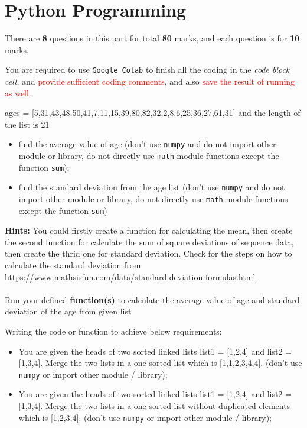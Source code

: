 \documentclass[a4paper]{article}
\begin{document}
    \part{Python Programming}\label{sec:part1}

    There are \textbf{8} questions in this part for total \textbf{80} marks, and each question is for \textbf{10} marks. 
    
    You are required to use \texttt{Google Colab} to 
    finish all the coding in the \textit{code block cell},
    and \textcolor{red}{provide sufficient coding comments},
    and also \textcolor{red}{save the result of running as well}. 
    
    \begin{answer}[Question 1.1] 
        ages = [5,31,43,48,50,41,7,11,15,39,80,82,32,2,8,6,25,36,27,61,31] and the length of the list is 21
        \begin{itemize}
            \item find the average value of age 
            (don't use \texttt{numpy} and do not import other module or library, do not directly use \texttt{math} module functions except the function \texttt{sum});
            \item find the standard deviation from the age list 
            (don't use \texttt{numpy} and do not import other module or library, do not directly use \texttt{math} module functions except the function \texttt{sum})
        \end{itemize} 
        \textbf{Hints:}
        You could firstly create a function for calculating the mean,
        then create the second function for calculate the sum of square deviations of sequence data, then create the thrid one for standard deviation. Check for the steps on how to calculate the standard deviation from \url{https://www.mathsisfun.com/data/standard-deviation-formulas.html}\\
        \\
        Run your defined \textbf{function(s)} to calculate the average value of age and standard deviation of the age from given list
    \end{answer}
    
    \begin{answer}[Question 1.2]
    Writing the code or function to achieve below requirements:
        \begin{itemize}
            \item You are given the heads of two sorted linked lists list1 = [1,2,4] and list2 = [1,3,4]. Merge the two lists in a one sorted list which is [1,1,2,3,4,4]. (don't use \texttt{numpy} or import other module / library);
            \item You are given the heads of two sorted linked lists list1 = [1,2,4] and list2 = [1,3,4]. Merge the two lists in a one sorted list without duplicated elements which is [1,2,3,4]. (don't use \texttt{numpy} or import other module / library);
        \end{itemize} 
    \end{answer}
    
\end{document}
